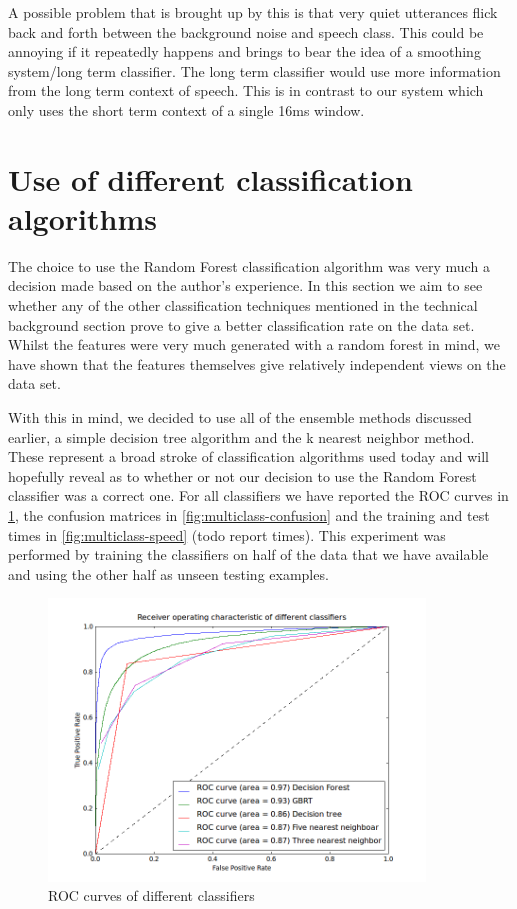 \documentclass[ %
                    author={Sam Phippen},
                supervisor={Dr. Rafal Bogacz},
                     title={Real time voice activity detectors in noisy personal computing environments},
                  subtitle={},
                    degree={MEng},
                      year={2012} ]{thesis}
\begin{document}
A possible problem that is brought up by this is that very quiet utterances
flick back and forth between the background noise and speech class. This could
be annoying if it repeatedly happens and brings to bear the idea of a smoothing
system/long term classifier. The long term classifier would use more
information from the long term context of speech. This is in contrast to our
system which only uses the short term context of a single 16ms window.

\section{Use of different classification algorithms}

The choice to use the Random Forest classification algorithm was very much a
decision made based on the author's experience. In this section we aim to see
whether any of the other classification techniques mentioned in the technical
background section prove to give a better classification rate on the data set.
Whilst the features were very much generated with a random forest in mind, we
have shown that the features themselves give relatively independent views on
the data set.

With this in mind, we decided to use all of the ensemble methods discussed
earlier, a simple decision tree algorithm and the k nearest neighbor method.
These represent a broad stroke of classification algorithms used today and will
hopefully reveal as to whether or not our decision to use the Random Forest
classifier was a correct one. For all classifiers we have reported the ROC
curves in \ref{fig:multiclass-roc}, the confusion matrices in
\ref{fig:multiclass-confusion} and the training and test times in
\ref{fig:multiclass-speed} (todo report times). This experiment was performed
by training the classifiers on half of the data that we have available and
using the other half as unseen testing examples.

\begin{figure}
    \label{fig:multiclass-roc}
    \includegraphics[width=10cm]{roc_different.png}
    \caption{ROC curves of different classifiers}
\end{figure}
\end{document}
